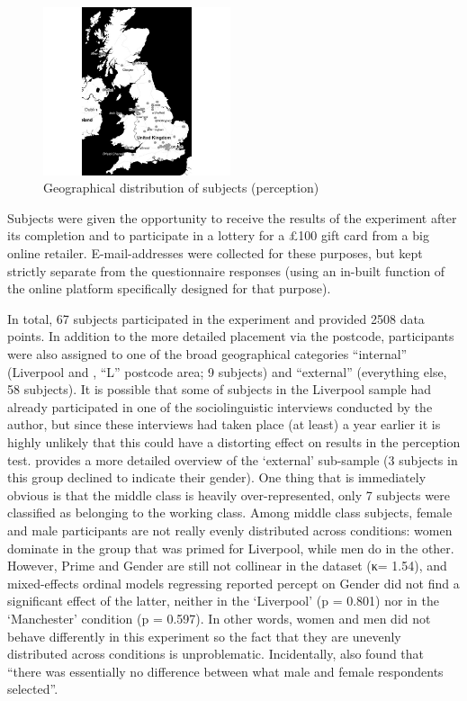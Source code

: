 \begin{figure}
	
	\includegraphics[width=0.49\textwidth]{./figures/participant_map}
	\caption{Geographical distribution of subjects (perception)}
	\label{fig.per.subjects}
\end{figure}

Subjects were given the opportunity to receive the results of the experiment after its completion and to participate in a lottery for a £100 gift card from a big online retailer.
E-mail-addresses were collected for these purposes, but kept strictly separate from the questionnaire responses (using an in-built function of the online platform specifically designed for that purpose).

In total, 67 subjects participated in the experiment and provided 2508 data points.
In addition to the more detailed placement via the postcode, participants were also assigned to one of the broad geographical categories ``internal'' (Liverpool and , ``L'' postcode area; 9 subjects) and ``external'' (everything else, 58 subjects).
It is possible that some of subjects in the Liverpool sample had already participated in one of the sociolinguistic interviews conducted by the author, but since these interviews had taken place (at least) a year earlier it is highly unlikely that this could have a distorting effect on results in the perception test.
 provides a more detailed overview of the `external' sub-sample (3 subjects in this group declined to indicate their gender).
One thing that is immediately obvious is that the middle class is heavily over-represented, only 7 subjects were classified as belonging to the working class.
Among middle class subjects, female and male participants are not really evenly distributed across  conditions: women dominate in the group that was primed for Liverpool, while men do in the other.
However, Prime and Gender are still not collinear in the dataset (κ= 1.54), and mixed-effects ordinal models regressing reported percept on Gender did not find a significant effect of the latter, neither in the `Liverpool' (p = 0.801) nor in the `Manchester' condition (p = 0.597).
In other words, women and men did not behave differently in this experiment so the fact that they are unevenly distributed across conditions is unproblematic.
Incidentally, \textcite[69 and 79--80]{niedzielski1999} also found that \enquote{there was essentially no difference between what male and female respondents selected}.

